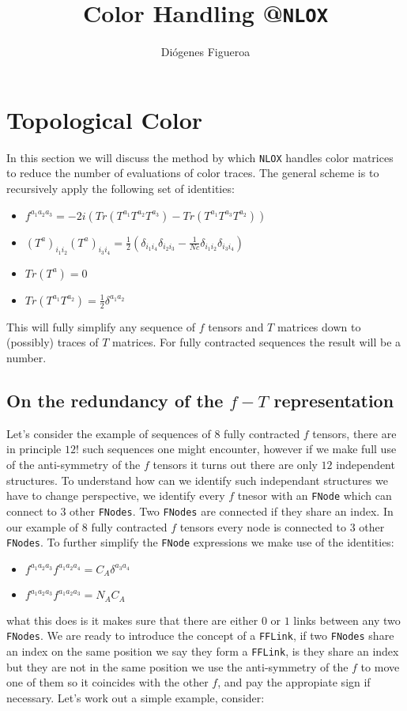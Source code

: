 \documentclass[a4paper]{article}
\title{Color Handling @\texttt{NLOX}}
\author{Diógenes Figueroa}
\begin{document}
\maketitle
\section{Topological Color}
In this section we will discuss the method by which \texttt{NLOX} handles color matrices to reduce the number 
of evaluations of color traces. The general scheme is to recursively apply the following set of identities:

\begin{itemize}
 \item $f^{a_1a_2a_3} = -2i(Tr(T^{a_1} T^{a_2} T^{a_3})-Tr(T^{a_1} T^{a_3} T^{a_2}))$
 \item $(T^a)_{i_1i_2}(T^a)_{i_3i_4} = \frac{1}{2}\left(\delta_{i_1i_4}\delta_{i_2i_3} - \frac{1}{Nc}\delta_{i_1i_2}\delta_{i_3i_4}\right)$
 \item $Tr(T^a) = 0$
 \item $Tr(T^{a_1}T^{a_2})=\frac{1}{2}\delta^{a_1 a_2}$
\end{itemize}

This will fully simplify any sequence of $f$ tensors and $T$ matrices down to (possibly) traces of $T$ matrices.
For fully contracted sequences the result will be a number. 

\subsection{On the redundancy of the $f-T$ representation}
Let's consider the example of sequences of $8$ fully contracted $f$ tensors, there are in principle $12!$ such sequences one might encounter, however if we make full use of the anti-symmetry of the $f$ tensors it turns out there are only $12$ independent structures. To understand how can we identify such independant structures we have to change perspective, we identify every $f$ tnesor with an \texttt{FNode} which can connect to $3$ other \texttt{FNodes}.
Two \texttt{FNodes} are connected if they share an index. In our example of $8$ fully contracted $f$ tensors 
every node is connected to $3$ other \texttt{FNodes}.
To further simplify the \texttt{FNode} expressions we make use of the identities:
\begin{itemize}
 \item $f^{a_1 a_2 a_3} f^{a_1a_2a_4} = C_A \delta^{a_3a_4}$
 \item $f^{a_1 a_2 a_3} f^{a_1a_2a_3} = N_A C_A $
\end{itemize}
what this does is it makes sure that there are either $0$ or $1$ links between any two \texttt{FNodes}.
We are ready to introduce the concept of a \texttt{FFLink}, if two \texttt{FNodes} share an index on the 
same position we say they form a \texttt{FFLink}, is they share an index but they are not in the same position
we use the anti-symmetry of the $f$ to move one of them so it coincides with the other $f$, and pay the appropiate
sign if necessary. Let's work out a simple example, consider:
\end{document}
